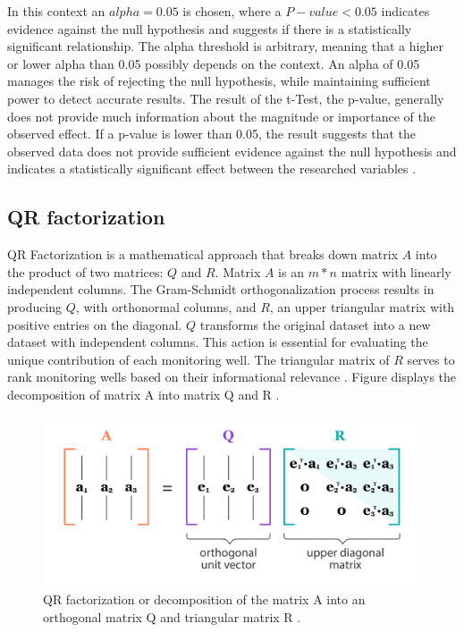 \noindent
In this context an \(alpha = 0.05\) is chosen, where a \(P-value < 0.05\) indicates evidence against the null hypothesis and suggests if there is a statistically significant relationship. The alpha threshold is arbitrary, meaning that a higher or lower alpha than 0.05 possibly depends on the context. An alpha of 0.05 manages the risk of rejecting the null hypothesis, while maintaining sufficient power to detect accurate results. The result of the t-Test, the p-value, generally does not provide much information about the magnitude or importance of the observed effect. If a p-value is lower than 0.05, the result suggests that the observed data does not provide sufficient evidence against the null hypothesis and indicates a statistically significant effect between the researched variables \cite{statistics-easily-2024}. 
 

\subsection{QR factorization}
QR Factorization is a mathematical approach that breaks down matrix \(A\) into the product of two matrices: \(Q\) and \(R\).  Matrix \(A\) is an \(m*n\) matrix with linearly independent columns. The Gram-Schmidt orthogonalization process results in producing \(Q\), with orthonormal columns, and \(R\), an upper triangular matrix with positive entries on the diagonal. \(Q\) transforms the original dataset into a new dataset with independent columns. This action is essential for evaluating the unique contribution of each monitoring well. The triangular matrix of \(R\) serves to rank monitoring wells based on their informational relevance \cite{university-of-regina-no-dateA}. Figure  displays the decomposition of matrix A into matrix Q and R \cite{harp-no-date}.
\begin{figure}[htbp]
    \centering
    \includegraphics[width=0.5\linewidth]{appendix/qrfac.png}
    \caption{QR factorization or decomposition of the matrix A into an orthogonal matrix Q and triangular matrix R \cite{harp-no-date}.}
    \label{QR}
    
\end{figure}

